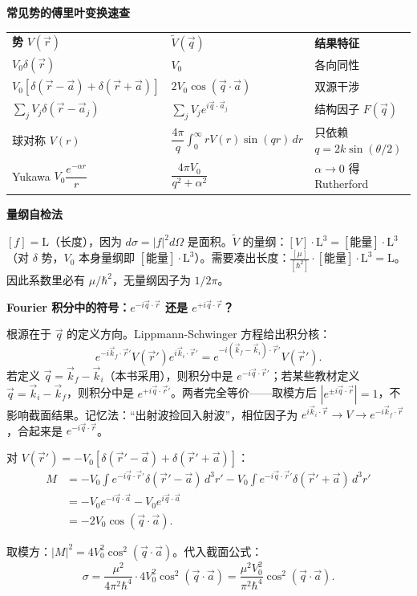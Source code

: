 \begin{cheatbox}
\textbf{常见势的傅里叶变换速查}

\begin{tabular}{lll}
\textbf{势} $V(\vec{r})$ & $\tilde{V}(\vec{q})$ & \textbf{结果特征} \\
$V_0\delta(\vec{r})$ & $V_0$ & 各向同性 \\
$V_0[\delta(\vec{r}-\vec{a}) + \delta(\vec{r}+\vec{a})]$ & $2V_0\cos(\vec{q}\cdot\vec{a})$ & 双源干涉 \\
$\sum_j V_j \delta(\vec{r}-\vec{a}_j)$ & $\sum_j V_j e^{i\vec{q}\cdot\vec{a}_j}$ & 结构因子 $F(\vec{q})$ \\
球对称 $V(r)$ & $\dfrac{4\pi}{q}\int_0^\infty rV(r)\sin(qr)\, dr$ & 只依赖 $q = 2k\sin(\theta/2)$ \\
Yukawa $V_0 \dfrac{e^{-\alpha r}}{r}$ & $\dfrac{4\pi V_0}{q^2 + \alpha^2}$ & $\alpha \to 0$ 得 Rutherford \\
\end{tabular}

\textbf{量纲自检法}

$[f] = \text{L}$（长度），因为 $d\sigma = |f|^2 d\Omega$ 是面积。$\tilde{V}$ 的量纲：$[V] \cdot \text{L}^3 = [\text{能量}] \cdot \text{L}^3$（对 $\delta$ 势，$V_0$ 本身量纲即 $[\text{能量}] \cdot \text{L}^3$）。需要凑出长度：$\frac{[\mu]}{[\hbar^2]} \cdot [\text{能量}] \cdot \text{L}^3 = \text{L}$。因此系数里必有 $\mu/\hbar^2$，无量纲因子为 $1/2\pi$。

\textbf{Fourier 积分中的符号：$e^{-i\vec{q}\cdot\vec{r}}$ 还是 $e^{+i\vec{q}\cdot\vec{r}}$？}

根源在于 $\vec{q}$ 的定义方向。Lippmann-Schwinger 方程给出积分核：
\[
e^{-i\vec{k}_f\cdot\vec{r}'} V(\vec{r}') e^{i\vec{k}_i\cdot\vec{r}'} = e^{-i(\vec{k}_f - \vec{k}_i)\cdot\vec{r}'} V(\vec{r}').
\]
若定义 $\vec{q} = \vec{k}_f - \vec{k}_i$（本书采用），则积分中是 $e^{-i\vec{q}\cdot\vec{r}'}$；若某些教材定义 $\vec{q} = \vec{k}_i - \vec{k}_f$，则积分中是 $e^{+i\vec{q}\cdot\vec{r}'}$。两者完全等价——取模方后 $|e^{\pm i\vec{q}\cdot\vec{r}}| = 1$，不影响截面结果。记忆法：``出射波捡回入射波''，相位因子为 $e^{i\vec{k}_i\cdot\vec{r}} \to V \to e^{-i\vec{k}_f\cdot\vec{r}}$，合起来是 $e^{-i\vec{q}\cdot\vec{r}}$。
\end{cheatbox}

\begin{derivationbox}[傅里叶积分的详细计算]

对 $V(\vec{r}') = -V_0[\delta(\vec{r}' - \vec{a}) + \delta(\vec{r}' + \vec{a})]$：
\begin{align*}
M &= -V_0 \int e^{-i\vec{q}\cdot\vec{r}'} \delta(\vec{r}' - \vec{a}) \, d^3r' - V_0 \int e^{-i\vec{q}\cdot\vec{r}'} \delta(\vec{r}' + \vec{a}) \, d^3r' \\
&= -V_0 e^{-i\vec{q}\cdot\vec{a}} - V_0 e^{i\vec{q}\cdot\vec{a}} \\
&= -2V_0 \cos(\vec{q}\cdot\vec{a}).
\end{align*}

取模方：$|M|^2 = 4V_0^2 \cos^2(\vec{q}\cdot\vec{a})$。代入截面公式：
\[
\sigma = \frac{\mu^2}{4\pi^2\hbar^4} \cdot 4V_0^2 \cos^2(\vec{q}\cdot\vec{a}) = \frac{\mu^2 V_0^2}{\pi^2\hbar^4} \cos^2(\vec{q}\cdot\vec{a}).
\]
\end{derivationbox}

